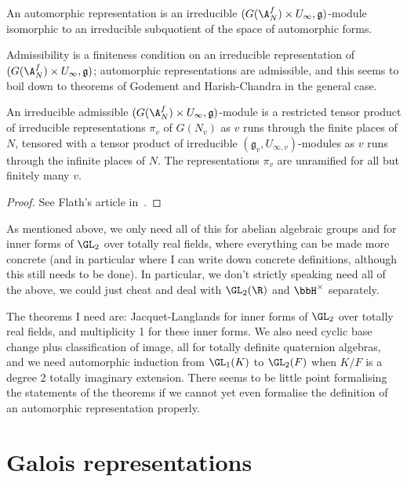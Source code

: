 \begin{definition}\label{automorphic_representation}\notready An automorphic representation is an irreducible $(G(\A_N^f)\times U_\infty,\mathfrak{g})$-module isomorphic to an irreducible subquotient of the space of automorphic forms.
\end{definition}

Admissibility is a finiteness condition on an irreducible representation of $(G(\A_N^f)\times U_\infty,\mathfrak{g})$; automorphic representations are admissible, and this seems to boil down to theorems of Godement and Harish-Chandra in the general case.


\begin{theorem}\label{automorphic_representation_local_decomposition}\notready An irreducible admissible $(G(\A_N^f)\times U_\infty,\mathfrak{g})$-module is a restricted tensor product of irreducible representations $\pi_v$ of $G(N_v)$ as $v$ runs through the finite places of $N$, tensored with a tensor product of irreducible $(\mathfrak{g}_v,U_{\infty,v})$-modules as $v$ runs through the infinite places of $N$. The representations $\pi_v$ are unramified for all but finitely many $v$.
\end{theorem}
\begin{proof} See Flath's article in~\cite{corvallis2}.
\end{proof}

As mentioned above, we only need all of this for abelian algebraic groups and for inner forms of $\GL_2$ over totally real fields, where everything can be made more concrete (and in particular where I can write down concrete definitions, although this still needs to be done). In particular, we don't strictly speaking need all of the above, we could just cheat and deal with $\GL_2(\R)$ and $\bbH^\times$ separately.

The theorems I need are: Jacquet-Langlands for inner forms of $\GL_2$ over totally real fields,
and multiplicity 1 for these inner forms. We also need cyclic base change plus classification of image, all for totally definite quaternion algebras, and we need
automorphic induction from $\GL_1(K)$ to $\GL_2(F)$ when $K/F$ is a degree 2 totally imaginary extension. There seems to be little point formalising the statements of the theorems if we cannot yet even formalise the definition of an automorphic representation properly.

\section{Galois representations}

